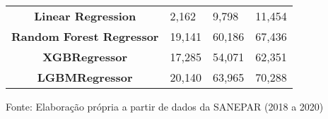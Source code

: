 \begin{table}[H]
\begin{tabular}{@{}clll@{}}
\textbf{Linear Regression}        & 2,162                             & 9,798                            & 11,454                            \\
\textbf{Random Forest Regressor}  & 19,141                            & 60,186                           & 67,436                            \\
\textbf{XGBRegressor}             & 17,285                            & 54,071                           & 62,351                            \\
\textbf{LGBMRegressor}            & 20,140                            & 63,965                           & 70,288                            \\ \bottomrule
	\end{tabular}

Fonte: Elaboração própria a partir de dados da SANEPAR (2018 a 2020)
\end{table}

